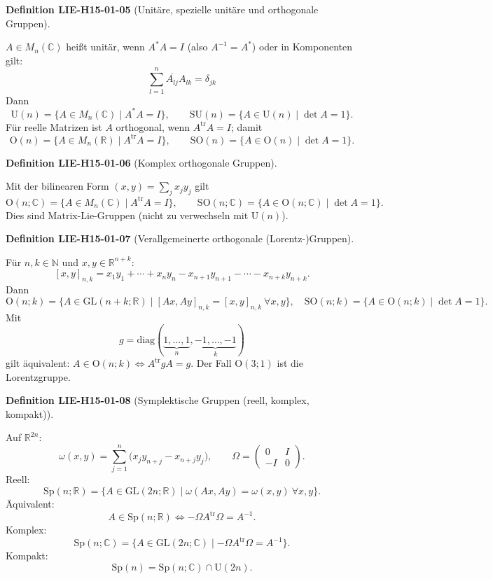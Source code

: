 \documentclass[10pt, letterpaper]{article}
\newcommand{\R}{\mathbb{R}}
\newcommand{\N}{\mathbb{N}}
\newcommand{\C}{\mathbb{C}}
\newcommand{\GL}{\mathrm{GL}}
\newcommand{\SO}{\mathrm{SO}}
\newcommand{\SU}{\mathrm{SU}}
\newcommand{\Sp}{\mathrm{Sp}}
\newcommand{\Ogroup}{\mathrm{O}} %
\newcommand{\U}{\mathrm{U}}
\newcommand{\CustomHeading}[3]{%
  \par\medskip\noindent%
  \textbf{#1 #2} \textnormal{(#3)}.\enskip%
}
\newenvironment{DEF}[2]{\CustomHeading{Definition}{#1}{#2}}{}
\begin{document}
\begin{DEF}{LIE-H15-01-05}{Unitäre, spezielle unitäre und orthogonale Gruppen}
$A\in M_n(\C)$ heißt unitär, wenn $A^*A=I$ (also $A^{-1}=A^*$) oder in Komponenten gilt:
$$
\sum_{l=1}^{n} \overline{A_{l j}} A_{l k}=\delta_{j k}
$$
Dann
\[
\U(n)=\{A\in M_n(\C)\mid A^*A=I\},\qquad
\SU(n)=\{A\in \U(n)\mid \det A=1\}.
\]
Für reelle Matrizen ist $A$ orthogonal, wenn $A^{\mathrm{tr}}A=I$; damit
\[
\Ogroup(n)=\{A\in M_n(\R)\mid A^{\mathrm{tr}}A=I\},\qquad
\SO(n)=\{A\in \Ogroup (n)\mid \det A=1\}.
\]
\end{DEF}

\begin{DEF}{LIE-H15-01-06}{Komplex orthogonale Gruppen}
Mit der bilinearen Form $(x,y)=\sum_j x_jy_j$ gilt
\[
\Ogroup(n;\C)=\{A\in M_n(\C)\mid A^{\mathrm{tr}}A=I\},\qquad
\SO(n;\C)=\{A\in \Ogroup (n;\C)\mid \det A=1\}.
\]
Dies sind Matrix-Lie-Gruppen (nicht zu verwechseln mit $\U(n)$).
\end{DEF}

\begin{DEF}{LIE-H15-01-07}{Verallgemeinerte orthogonale (Lorentz-)Gruppen}
Für $n,k\in\N$ und $x,y\in\R^{n+k}$:
\[
[x,y]_{n,k}=x_1y_1+\cdots+x_ny_n - x_{n+1}y_{n+1}-\cdots - x_{n+k}y_{n+k}.
\]
Dann
\[
\Ogroup(n;k)=\{A\in \GL(n{+}k;\R)\mid [Ax,Ay]_{n,k}=[x,y]_{n,k}\ \forall x,y\},\quad
\SO(n;k)=\{A\in \Ogroup (n;k)\mid \det A=1\}.
\]
Mit
\[
g=\mathrm{diag}(\underbrace{1,\dots,1}_{n},\underbrace{-1,\dots,-1}_{k})
\]
gilt äquivalent: $A\in\Ogroup(n;k)\iff A^{\mathrm{tr}}gA=g$. Der Fall $\Ogroup(3;1)$ ist die Lorentzgruppe.
\end{DEF}

\begin{DEF}{LIE-H15-01-08}{Symplektische Gruppen (reell, komplex, kompakt)}
Auf $\R^{2n}$:
\[
\omega(x,y)=\sum_{j=1}^n\big(x_j y_{n+j} - x_{n+j} y_j\big),\qquad
\Omega=\begin{pmatrix}0&I\\ -I&0\end{pmatrix}.
\]
Reell:
\[
\Sp(n;\R)=\{A\in \GL(2n;\R)\mid \omega(Ax,Ay)=\omega(x,y)\ \forall x,y\}.
\]
Äquivalent:
\[
A\in\Sp(n;\R)\iff -\Omega A^{\mathrm{tr}}\Omega = A^{-1}.
\]
Komplex:
\[
\Sp(n;\C)=\{A\in \GL(2n;\C)\mid -\Omega A^{\mathrm{tr}}\Omega = A^{-1}\}.
\]
Kompakt:
\[
\Sp(n)=\Sp(n;\C)\cap \U(2n).
\]
\end{DEF}
\end{document}

